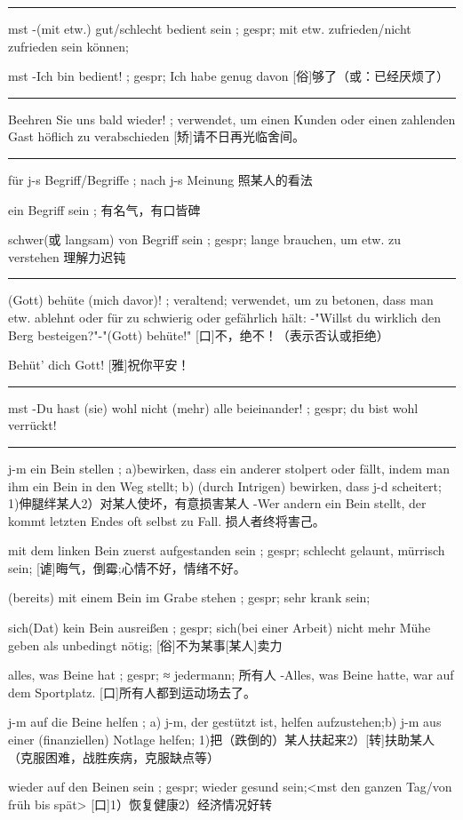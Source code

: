 \noindent\rule{\textwidth}{1pt} 
mst -(mit etw.) gut/schlecht bedient sein ; gespr; mit etw. zufrieden/nicht zufrieden sein können;

mst -Ich bin bedient! ; gespr; Ich habe genug davon
[俗]够了（或：已经厌烦了）

\noindent\rule{\textwidth}{1pt} 
Beehren Sie uns bald wieder! ; verwendet, um einen Kunden oder einen zahlenden Gast höflich zu verabschieden
[矫]请不日再光临舍间。

\noindent\rule{\textwidth}{1pt} 
für j-s Begriff/Begriffe ; nach j-s Meinung
照某人的看法

ein Begriff sein ; 有名气，有口皆碑

schwer(或 langsam) von Begriff sein ; gespr; lange brauchen, um etw. zu verstehen 
理解力迟钝

\noindent\rule{\textwidth}{1pt} 
(Gott) behüte (mich davor)! ; veraltend; verwendet, um zu betonen, dass man etw. ablehnt oder für zu schwierig oder gefährlich hält:
-"Willst du wirklich den Berg besteigen?"-"(Gott) behüte!"
[口]不，绝不！（表示否认或拒绝）

Behüt' dich Gott! [雅]祝你平安！

\noindent\rule{\textwidth}{1pt} 
mst -Du hast (sie) wohl nicht (mehr) alle beieinander! ; gespr; du bist wohl verrückt!

\noindent\rule{\textwidth}{1pt} 
j-m ein Bein stellen ; a)bewirken, dass ein anderer stolpert oder fällt, indem man ihm ein Bein in den Weg stellt; b) (durch Intrigen) bewirken, dass j-d scheitert;
1)伸腿绊某人2）对某人使坏，有意损害某人
-Wer andern ein Bein stellt, der kommt letzten Endes oft selbst zu Fall. 损人者终将害己。

mit dem linken Bein zuerst aufgestanden sein ; gespr; schlecht gelaunt, mürrisch sein;
[谑]晦气，倒霉;心情不好，情绪不好。

(bereits) mit einem Bein im Grabe stehen ; gespr; sehr krank sein;


sich(Dat) kein Bein ausreißen ; gespr; sich(bei einer Arbeit) nicht mehr Mühe geben als unbedingt nötig;
[俗]不为某事[某人]卖力

alles, was Beine hat ; gespr; ≈ jedermann;
所有人
-Alles, was Beine hatte, war auf dem Sportplatz. [口]所有人都到运动场去了。

j-m auf die Beine helfen ; a) j-m, der gestützt ist, helfen aufzustehen;b) j-m aus einer (finanziellen) Notlage helfen;
1)把（跌倒的）某人扶起来2）[转]扶助某人（克服困难，战胜疾病，克服缺点等）

wieder auf den Beinen sein ; gespr; wieder gesund sein;\textless mst den ganzen Tag/von früh bis spät\textgreater 
[口]1）恢复健康2）经济情况好转

